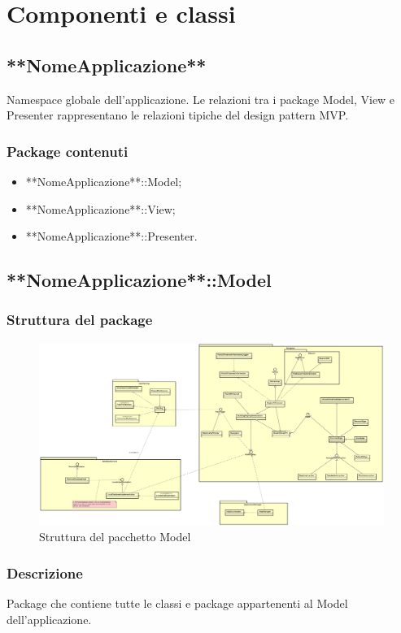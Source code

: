 \documentclass[../SpecificaTecnica.tex]{subfiles}
\begin{document}
\section{Componenti e classi}
	\subsection{**NomeApplicazione**}
	Namespace globale dell'applicazione. Le relazioni tra i package Model, View e Presenter rappresentano le relazioni tipiche del design pattern MVP.
		\subsubsection{Package contenuti}
			\begin{itemize}
				\item **NomeApplicazione**::Model;
				\item **NomeApplicazione**::View;
				\item **NomeApplicazione**::Presenter.
			\end{itemize}
	\newpage
	\subsection{**NomeApplicazione**::Model}
		\subsubsection{Struttura del package}
				\begin{figure}[!h]
					\centering
					\includegraphics[scale=0.12]{diagrammi/Model.png}
						\caption{Struttura del pacchetto Model}
					\label{fig:Struttura_MVP}
				\end{figure} 
		\subsubsection{Descrizione}
			Package che contiene tutte le classi e package appartenenti al Model dell'applicazione.
\end{document}
